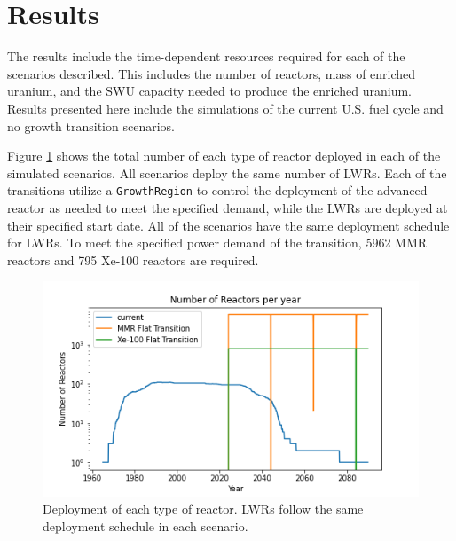 \section{Results}

The results include the time-dependent resources required 
for each of the scenarios described. This includes 
the number of reactors, mass of enriched uranium, and the 
\gls{SWU} capacity needed to produce the enriched uranium.
Results presented here include the simulations of the 
current U.S. fuel cycle and no growth transition scenarios. 

Figure \ref{fig:rx_deployment} shows the total number 
of each type of reactor deployed in each of the simulated 
scenarios. All scenarios deploy the same number of \gls{LWR}s. 
Each of the transitions utilize a \Cycamore \texttt{GrowthRegion} 
to control the deployment of the advanced reactor as needed 
to meet the specified demand, while the \gls{LWR}s are 
deployed at their specified start date. All of the scenarios 
have the same deployment schedule for \gls{LWR}s. To meet the
specified power demand of the transition, 5962 
\gls{MMR} reactors and 795 Xe-100 reactors are required.  


\begin{figure}[ht]
    \centering
    \includegraphics[scale=0.5]{figures/rx_deployment_all.png}
    \caption{Deployment of each type of reactor. \gls{LWR}s follow 
    the same deployment schedule in each scenario.}
    \label{fig:rx_deployment}
\end{figure}

